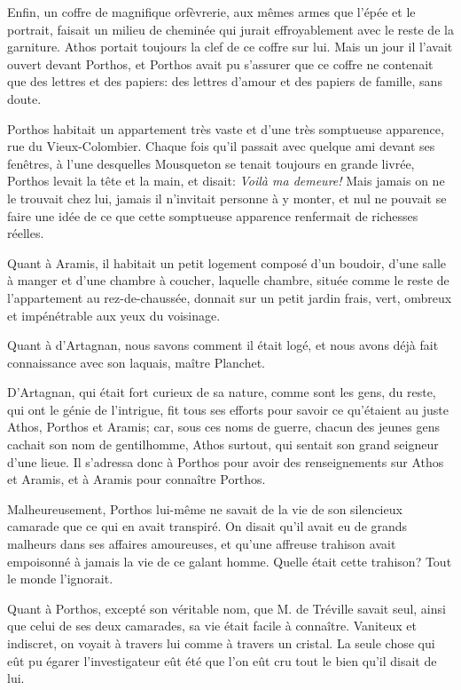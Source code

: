 Enfin, un coffre de magnifique orfèvrerie, aux mêmes armes que l'épée et le portrait, faisait un milieu de cheminée qui jurait effroyablement avec le reste de la garniture. Athos portait toujours la clef de ce coffre sur lui. Mais un jour il l'avait ouvert devant Porthos, et Porthos avait pu s'assurer que ce coffre ne contenait que des lettres et des papiers: des lettres d'amour et des papiers de famille, sans doute. 

Porthos habitait un appartement très vaste et d'une très somptueuse apparence, rue du Vieux-Colombier. Chaque fois qu'il passait avec quelque ami devant ses fenêtres, à l'une desquelles Mousqueton se tenait toujours en grande livrée, Porthos levait la tête et la main, et disait: \textit{Voilà ma demeure!} Mais jamais on ne le trouvait chez lui, jamais il n'invitait personne à y monter, et nul ne pouvait se faire une idée de ce que cette somptueuse apparence renfermait de richesses réelles. 

Quant à Aramis, il habitait un petit logement composé d'un boudoir, d'une salle à manger et d'une chambre à coucher, laquelle chambre, située comme le reste de l'appartement au rez-de-chaussée, donnait sur un petit jardin frais, vert, ombreux et impénétrable aux yeux du voisinage. 

Quant à d'Artagnan, nous savons comment il était logé, et nous avons déjà fait connaissance avec son laquais, maître Planchet. 

D'Artagnan, qui était fort curieux de sa nature, comme sont les gens, du reste, qui ont le génie de l'intrigue, fit tous ses efforts pour savoir ce qu'étaient au juste Athos, Porthos et Aramis; car, sous ces noms de guerre, chacun des jeunes gens cachait son nom de gentilhomme, Athos surtout, qui sentait son grand seigneur d'une lieue. Il s'adressa donc à Porthos pour avoir des renseignements sur Athos et Aramis, et à Aramis pour connaître Porthos. 

Malheureusement, Porthos lui-même ne savait de la vie de son silencieux camarade que ce qui en avait transpiré. On disait qu'il avait eu de grands malheurs dans ses affaires amoureuses, et qu'une affreuse trahison avait empoisonné à jamais la vie de ce galant homme. Quelle était cette trahison? Tout le monde l'ignorait. 

Quant à Porthos, excepté son véritable nom, que M. de Tréville savait seul, ainsi que celui de ses deux camarades, sa vie était facile à connaître. Vaniteux et indiscret, on voyait à travers lui comme à travers un cristal. La seule chose qui eût pu égarer l'investigateur eût été que l'on eût cru tout le bien qu'il disait de lui. 

